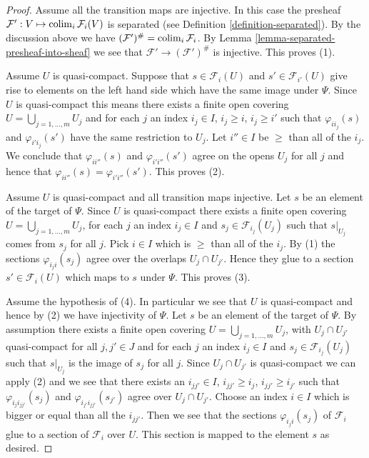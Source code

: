 \begin{proof}
Assume all the transition maps are injective. In this case the presheaf
$\mathcal{F}' : V \mapsto \mathop{\mathrm{colim}}\nolimits_i \mathcal{F}_i(V)$ is
separated (see Definition \ref{definition-separated}).
By the discussion above we have
$(\mathcal{F}')^\# = \mathop{\mathrm{colim}}\nolimits_i \mathcal{F}_i$.
By Lemma \ref{lemma-separated-presheaf-into-sheaf} we see that
$\mathcal{F}' \to (\mathcal{F}')^\#$ is injective. This proves (1).

\medskip\noindent
Assume $U$ is quasi-compact.
Suppose that $s \in \mathcal{F}_i(U)$ and
$s' \in \mathcal{F}_{i'}(U)$ give rise to elements on
the left hand side which have the same image under $\Psi$.
Since $U$ is quasi-compact this means there exists
a finite open covering $U = \bigcup_{j = 1, \ldots, m} U_j$
and for each $j$ an index $i_j \in I$, $i_j \geq i$, $i_j \geq i'$
such that $\varphi_{ii_j}(s)$ and $\varphi_{i'i_j}(s')$ have the
same restriction to $U_j$.
Let $i''\in I$ be $\geq$ than all of the $i_j$.
We conclude that $\varphi_{ii''}(s)$ and $\varphi_{i'i''}(s')$
agree on the opens $U_j$ for all $j$ and hence that
$\varphi_{ii''}(s) = \varphi_{i'i''}(s')$. This proves (2).

\medskip\noindent
Assume $U$ is quasi-compact and all transition maps injective.
Let $s$ be an element of the target of $\Psi$.
Since $U$ is quasi-compact
there exists a finite open covering $U = \bigcup_{j = 1, \ldots, m} U_j$,
for each $j$ an index $i_j \in I$ and $s_j \in \mathcal{F}_{i_j}(U_j)$
such that $s|_{U_j}$ comes from $s_j$ for all $j$.
Pick $i \in I$ which is $\geq$ than all of the $i_j$.
By (1) the sections $\varphi_{i_ji}(s_j)$ agree over the
overlaps $U_j \cap U_{j'}$. Hence they glue to a section
$s' \in \mathcal{F}_i(U)$ which maps to $s$ under $\Psi$.
This proves (3).

\medskip\noindent
Assume the hypothesis of (4). In particular we see that
$U$ is quasi-compact and hence by (2) we have injectivity of $\Psi$.
Let $s$ be an element of the target of $\Psi$.
By assumption there  exists a finite open covering
$U = \bigcup_{j = 1, \ldots, m} U_j$, with $U_j \cap U_{j'}$
quasi-compact for all $j, j' \in J$ and
for each $j$ an index $i_j \in I$ and $s_j \in \mathcal{F}_{i_j}(U_j)$
such that $s|_{U_j}$ is the image of $s_j$ for all $j$.
Since $U_j \cap U_{j'}$ is quasi-compact we can apply (2)
and we see that there exists an $i_{jj'} \in I$,
$i_{jj'} \geq i_j$, $i_{jj'} \geq i_{j'}$ such that
$\varphi_{i_ji_{jj'}}(s_j)$ and $\varphi_{i_{j'}i_{jj'}}(s_{j'})$
agree over $U_j \cap U_{j'}$. Choose an index $i \in I$
which is bigger or equal than all the $i_{jj'}$. Then we see that
the sections $\varphi_{i_ji}(s_j)$ of $\mathcal{F}_i$ glue
to a section of $\mathcal{F}_i$ over $U$. This section is mapped
to the element $s$ as desired.
\end{proof}


